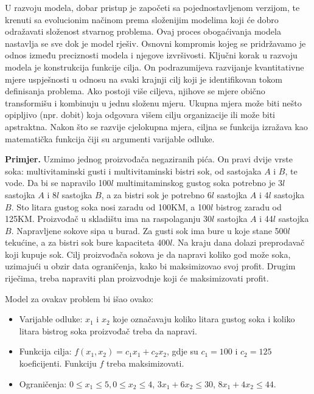 \documentclass[a4paper, utf8, 11pt, colorlinks]{book}
\begin{document}
 U razvoju modela, dobar pristup je započeti sa pojednostavljenom verzijom, te   krenuti sa evolucionim načinom prema složenijim modelima koji će dobro odražavati složenost stvarnog problema. Ovaj proces obogaćivanja modela nastavlja se sve dok je model rješiv. Osnovni kompromis kojeg se pridržavamo je odnos između preciznosti modela i njegove izvršivosti. Ključni korak u razvoju modela je konstrukcija funkcije cilja.
On podrazumijeva razvijanje kvantitativne mjere uspješnosti u odnosu na svaki   krajnji cilj koji je identifikovan tokom definisanja problema.
Ako postoji više ciljeva, njihove se mjere obično transformišu
i kombinuju u jednu složenu mjeru.  Ukupna mjera može biti nešto opipljivo (npr. dobit) koja odgovara višem cilju
organizacije ili može biti apstraktna.  Nakon što se razvije cjelokupna mjera,  ciljna se funkcija izražava kao matematička funkcija čiji su argumenti varijable odluke. 

\textbf{Primjer.}  Uzmimo jednog proizvođa\v ca negaziranih pi\'ca. On pravi dvije vrste soka: multivitaminski gusti i multivitaminski bistri sok, od sastojaka $A$ i $B$, te vode. Da bi se napravilo 100$l$ multimitaminskog gustog soka potrebno je 3$l$
sastojka $A$ i 8$l$ sastojka $B$, a za bistri sok je potrebno 6$l$ sastojka $A$ i 4$l$ sastojka $B$. Sto litara gustog soka nosi zaradu od 100KM, a 100$l$ bistrog zaradu od 125KM. Proizvođa\v c u skladi\v stu
ima na raspolaganju 30$l$ sastojka $A$ i 44$l$ sastojka $B.$ Napravljene sokove sipa u burad. Za
gusti sok ima bure u koje stane 500$l$ teku\' cine, a za bistri sok bure kapaciteta 400$l$. Na kraju dana dolazi preprodava\v c koji kupuje sok. Cilj proizvođa\v ca sokova je da napravi koliko god
mo\v ze soka, uzimaju\' ci u obzir data ograni\v cenja, kako bi maksimizovao svoj profit. Drugim
rije\v cima, treba napraviti plan proizvodnje koji \' ce maksimizovati profit.

Model za ovakav problem bi išao ovako:
\begin{itemize}
    \item 
Varijable odluke: $x_1$ i $x_2$ koje označavaju koliko litara gustog soka i koliko litara bistrog soka proizvođač treba da napravi.  
\item Funkcija cilja: $f(x_1, x_2) = c_1x_1 + c_2 x_2$, gdje su $c_1 = 100$ i  $c_2 = 125$ koeficijenti. Funkciju $f$ treba maksimizovati. \\
\item Ograničenja: $0 \leq x_1 \leq 5, 0 \leq x_2 \leq 4$,   $3 x_1 + 6 x_2 \leq 30$, $8 x_1 + 4 x_2 \leq 44.$
\end{itemize}
\end{document}
